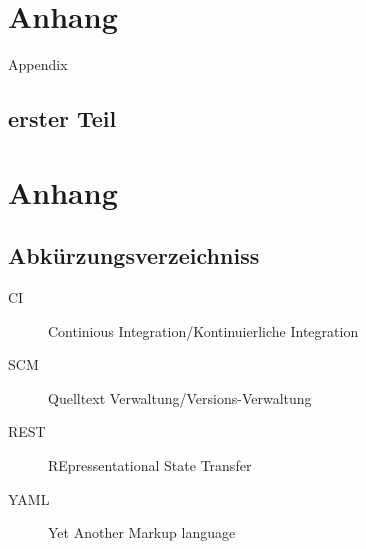 \appendix
\chapter{Anhang}
Appendix
\section{erster Teil}
\chapter{Anhang}
\section{Abk\"urzungsverzeichniss}
\begin{description}
  \item[CI] Continious Integration/Kontinuierliche Integration
  \item[SCM] Quelltext Verwaltung/Versions-Verwaltung
  \item[REST] REpressentational State Transfer \cite{rest:definition}
  \item[YAML] Yet Another Markup language \cite{yaml:website}
\end{description}
